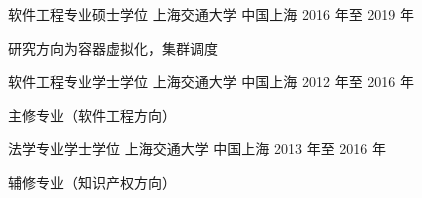 

\begin{cventries}

  \cventry
    {软件工程专业硕士学位} %
    {上海交通大学} %
    {中国上海} %
    {2016 年至 2019 年} %
    {
      \begin{cvitems} %
        \item 研究方向为容器虚拟化，集群调度
      \end{cvitems}
    }

  \cventry
    {软件工程专业学士学位} %
    {上海交通大学} %
    {中国上海} %
    {2012 年至 2016 年} %
    {
      \begin{cvitems} %
        \item 主修专业（软件工程方向）
      \end{cvitems}
    }

  \cventry
    {法学专业学士学位} %
    {上海交通大学} %
    {中国上海} %
    {2013 年至 2016 年} %
    {
      \begin{cvitems} %
      \item 辅修专业（知识产权方向）
      \end{cvitems}
    }
\end{cventries}
